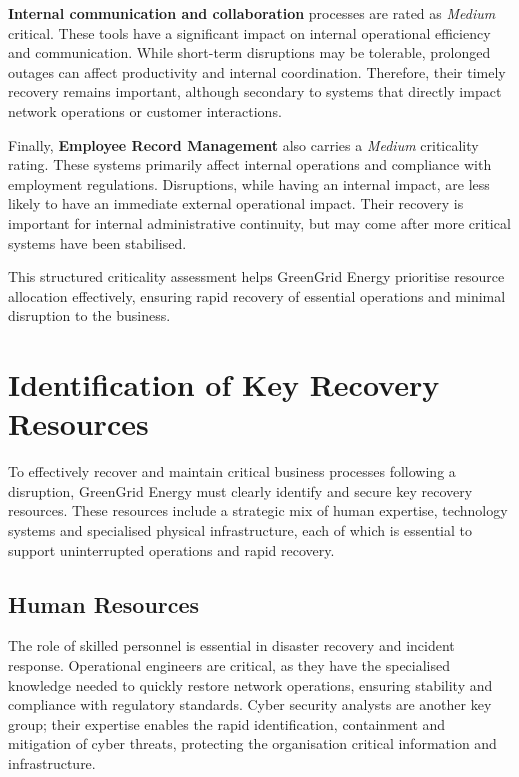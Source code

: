 \textbf{Internal communication and collaboration} processes are rated as \emph{Medium} critical. These tools have a significant impact on internal operational efficiency and communication. While short-term disruptions may be tolerable, prolonged outages can affect productivity and internal coordination. Therefore, their timely recovery remains important, although secondary to systems that directly impact network operations or customer interactions.

Finally, \textbf{Employee Record Management} also carries a \emph{Medium} criticality rating. These systems primarily affect internal operations and compliance with employment regulations. Disruptions, while having an internal impact, are less likely to have an immediate external operational impact. Their recovery is important for internal administrative continuity, but may come after more critical systems have been stabilised.

This structured criticality assessment helps GreenGrid Energy prioritise resource allocation effectively, ensuring rapid recovery of essential operations and minimal disruption to the business.


\section{Identification of Key Recovery Resources}

To effectively recover and maintain critical business processes following a disruption, GreenGrid Energy must clearly identify and secure key recovery resources. These resources include a strategic mix of human expertise, technology systems and specialised physical infrastructure, each of which is essential to support uninterrupted operations and rapid recovery.

\subsection{Human Resources}

The role of skilled personnel is essential in disaster recovery and incident response. Operational engineers are critical, as they have the specialised knowledge needed to quickly restore network operations, ensuring stability and compliance with regulatory standards. Cyber security analysts are another key group; their expertise enables the rapid identification, containment and mitigation of cyber threats, protecting the organisation critical information and infrastructure.


